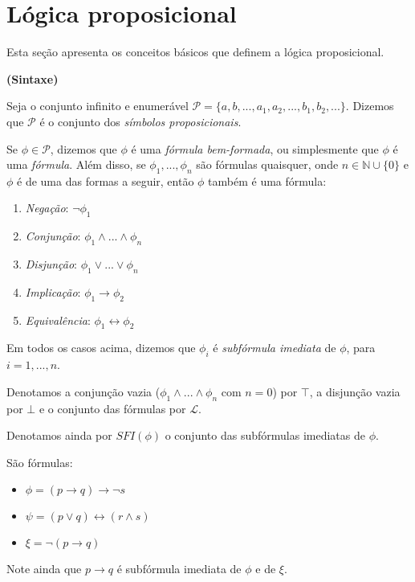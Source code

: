 
\label{cap_referencial}

\section{Lógica proposicional}

\indent

Esta seção apresenta os conceitos básicos que definem a lógica proposicional.

\begin{definition}\textbf{(Sintaxe)}
	
	Seja o conjunto infinito e enumerável $\mathcal{P} = \{a,b,...,a_1,a_2,...,b_1,b_2,...\}$. Dizemos que $\mathcal{P}$ é o conjunto dos \emph{símbolos proposicionais}.
	
    Se $\phi \in \mathcal{P}$, dizemos que $\phi$ é uma \emph{fórmula bem-formada}, ou simplesmente que $\phi$ é uma \emph{fórmula}. Além disso, se $\phi_1,...,\phi_n$ são fórmulas quaisquer, onde $n \in \mathbb{N} \cup \{0\}$ e $\phi$ é de uma das formas a seguir, então $\phi$ também é uma fórmula:
    \begin{enumerate}
        \item \emph{Negação}: $\neg \phi_1$
        \item \emph{Conjunção}: $\phi_1 \wedge ... \wedge \phi_n$
        \item \emph{Disjunção}: $\phi_1 \vee ... \vee \phi_n$
        \item \emph{Implicação}: $\phi_1 \rightarrow \phi_2$
        \item \emph{Equivalência}: $\phi_1 \leftrightarrow \phi_2$
    \end{enumerate}
    Em todos os casos acima, dizemos que $\phi_i$ é \emph{subfórmula imediata} de $\phi$, para $i=1,...,n$.
    
    Denotamos a conjunção vazia ($\phi_1 \wedge ... \wedge \phi_n$ com $n=0$) por $\top$, a disjunção vazia por $\bot$ e o conjunto das fórmulas por $\mathcal{L}$.
    
    Denotamos ainda por $SFI(\phi)$ o conjunto das subfórmulas imediatas de $\phi$.
\end{definition}

\begin{example}
	São fórmulas:
	\begin{itemize}
		\item $\phi = (p \rightarrow q) \rightarrow \neg s$
		\item $\psi = (p \vee q) \leftrightarrow (r \wedge s)$
		\item $\xi  = \neg(p \rightarrow q)$
	\end{itemize}
	
	Note ainda que $p \rightarrow q$ é subfórmula imediata de $\phi$ e de $\xi$.
\end{example}

